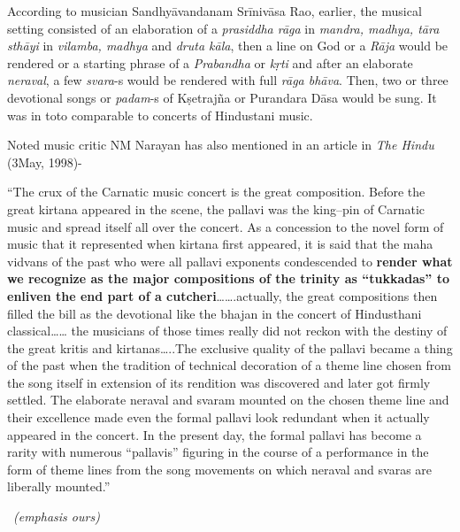 According to musician Sandhyāvandanam Srīnivāsa Rao, earlier, the musical setting consisted of an elaboration of a \textit{prasiddha rāga} in \textit{mandra, madhya, tāra sthāyi} in \textit{vilamba, madhya} and \textit{druta kāla}, then a line on God or a \textit{Rāja} would be rendered or a starting phrase of a \textit{Prabandha} or \textit{kṛti} and after an elaborate \textit{neraval}, a few \textit{svara}-s would be rendered with full \textit{rāga bhāva}. Then, two or three devotional songs or \textit{padam}-s of Kṣetrajña or Purandara Dāsa would be sung. It was in toto comparable to concerts of Hindustani music.

Noted music critic NM Narayan has also mentioned in an article in \textit{The Hindu} (3May, 1998)-

\begin{myquote}
“The crux of the Carnatic music concert is the great composition. Before the great kirtana appeared in the scene, the pallavi was the king–pin of Carnatic music and spread itself all over the concert. As a concession to the novel form of music that it represented when kirtana first appeared, it is said that the maha vidvans of the past who were all pallavi exponents condescended to \textbf{render what we recognize as the major compositions of the trinity as “tukkadas” to enliven the end part of a cutcheri}…….actually, the great compositions then filled the bill as the devotional like the bhajan in the concert of Hindusthani classical…… the musicians of those times really did not reckon with the destiny of the great kritis and kirtanas…..The exclusive quality of the pallavi became a thing of the past when the tradition of technical decoration of a theme line chosen from the song itself in extension of its rendition was discovered and later got firmly settled. The elaborate neraval and svaram mounted on the chosen theme line and their excellence made even the formal pallavi look redundant when it actually appeared in the concert. In the present day, the formal pallavi has become a rarity with numerous “pallavis” figuring in the course of a performance in the form of theme lines from the song movements on which neraval and svaras are liberally mounted.”
\end{myquote}

\vspace{-.3cm}

\begin{myquote}

~\hfill \textit{(emphasis ours)}
\end{myquote}

